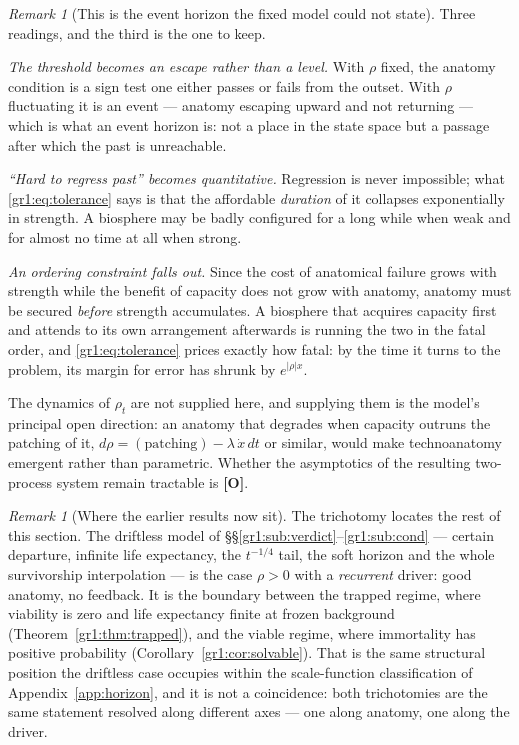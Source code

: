 \documentclass[11pt]{article}
\numberwithin{equation}{section}
\theoremstyle{plain}
\theoremstyle{definition}
\theoremstyle{remark}
\newtheorem{remark}[theorem]{Remark}
\begin{document}
\begin{remark}[This is the event horizon the fixed model could not
state]\label{gr1:rem:horizonproper}
Three readings, and the third is the one to keep.

\emph{The threshold becomes an escape rather than a level.} With $\rho$
fixed, the anatomy condition is a sign test one either passes or fails
from the outset. With $\rho$ fluctuating it is an event --- anatomy
escaping upward and not returning --- which is what an event horizon
is: not a place in the state space but a passage after which the past
is unreachable.

\emph{``Hard to regress past'' becomes quantitative.} Regression is
never impossible; what \eqref{gr1:eq:tolerance} says is that the
affordable \emph{duration} of it collapses exponentially in strength. A
biosphere may be badly configured for a long while when weak and for
almost no time at all when strong.

\emph{An ordering constraint falls out.} Since the cost of anatomical
failure grows with strength while the benefit of capacity does not
grow with anatomy, anatomy must be secured \emph{before} strength
accumulates. A biosphere that acquires capacity first and attends to
its own arrangement afterwards is running the two in the fatal order,
and \eqref{gr1:eq:tolerance} prices exactly how fatal: by the time it
turns to the problem, its margin for error has shrunk by
$e^{|\rho|x}$.
\end{remark}

\noindent The dynamics of $\rho_t$ are not supplied here, and supplying
them is the model's principal open direction: an anatomy that degrades
when capacity outruns the patching of it, $d\rho=(\text{patching})-
\lambda\,\dot x\,dt$ or similar, would make technoanatomy emergent
rather than parametric. Whether the asymptotics of the resulting
two-process system remain tractable is \textbf{[O]}.

\begin{remark}[Where the earlier results now sit]\label{gr1:rem:wherenow}
The trichotomy locates the rest of this section. The driftless model of
\S\S\ref{gr1:sub:verdict}--\ref{gr1:sub:cond} --- certain departure,
infinite life expectancy, the $t^{-1/4}$ tail, the soft horizon and the
whole survivorship interpolation --- is the case $\rho>0$ with a
\emph{recurrent} driver: good anatomy, no feedback. It is the boundary
between the trapped regime, where viability is zero and life expectancy
finite at frozen background (Theorem~\ref{gr1:thm:trapped}), and the
viable regime, where
immortality has positive probability
(Corollary~\ref{gr1:cor:solvable}). That is the same structural position
the driftless case occupies within the scale-function classification of
Appendix~\ref{app:horizon}, and it is not a coincidence: both
trichotomies are the same statement resolved along different axes ---
one along anatomy, one along the driver.
\end{remark}
\end{document}
